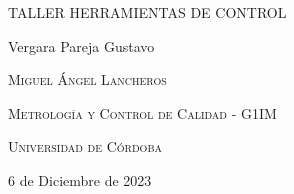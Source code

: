 \documentclass{article}
\author{Gustavo Vergara}
\theoremstyle{mytheoremstyle}
\theoremstyle{mytheoremstyle}
\theoremstyle{myproblemstyle}
\begin{document}
\pgfplotsset{compat=1.18}

\begin{titlepage}
	\centering
	\vspace{2.5cm}
	{\scshape \Large TALLER HERRAMIENTAS DE CONTROL \par}
	\vspace{5cm}
	\textbf\large\scshape{\par}
	\vspace{0.5cm}

	{\Large Vergara Pareja Gustavo\par}
	\vspace{5cm}
	{\scshape\Large Miguel Ángel Lancheros\par}
	\vspace{0.3cm}
	{\scshape\Large Metrología y Control de Calidad - G1IM \par}
	\vspace{0.3cm}
	{\scshape\Large Universidad de Córdoba\par}
	\vspace{0.3cm}
	{\Large 6 de Diciembre de 2023 \par}
\end{titlepage}
\tableofcontents
\newpage
\end{document}
